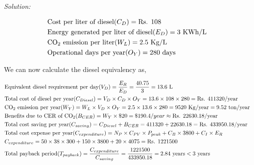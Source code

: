\documentclass{home_assignment}
\begin{document}
\pagebreak
\textit{Solution:}
\begin{fleqn}[\parindent]
    \begin{equation*}
       \begin{split}
        &\text{Cost per liter of diesel} (C_{D})= \text{Rs. } 108\\
        &\text{Energy generated per liter of diesel} (E_{D})=3 \text{ KWh/L}\\
        &\text{CO\textsubscript{2} emission per liter} (W_L)=2.5 \text{ Kg/L}\\
        &\text{Operational days per year} (O_Y)=280 \text{ days}       \end{split}
       \end{equation*}
\end{fleqn}
We can now calculate the diesel equivalency as,
\begin{fleqn}[\parindent]
    \begin{equation*}
       \begin{split}
        &\text{Equivalent diesel requirement per day} (V_{D})=\frac{E_R}{E_{D}} = \frac{40.75}{3}=13.6 \text{ L} \\
        &\text{Total cost of diesel per year} (C_{Diesel})= V_{D}\times C_{D}\times O_Y=13.6\times108\times280=\text{Rs. }411320\text{/year}\\
        &\text{CO\textsubscript{2} emission per year}(W_Y)=W_L\times V_{D}\times O_Y=2.5\times 13.6 \times 280=9520 \text{ Kg/year}=9.52 \text{ ton/year}\\
        &\text{Benefits due to CER of CO\textsubscript{2}} (B_{CER})=W_Y\times \$ 20=\$190.4/year\approx \text{Rs. }22630.18\text{/year}\\
        &\text{Total cost saving per year} (C_{saving})=C_{Diesel}+B_{CER}=411320+22630.18=\text{Rs. }433950.18\text{/year}\\
        &\text{Total cost expense per year} (C_{expenditure})=N_P\times C_{PV}\times P_{peak}+C_{B}\times3800+C_I\times E_R\\
        &C_{expenditure}=50\times38\times300+150\times3800+20\times4075=\text{Rs. }1221500\\
        &\text{Total payback period} (T_{payback})=\frac{C_{expenditure}}{C_{saving}}=\frac{1221500}{433950.18}=2.84\text{ years}<3 \text{ years}
         \end{split}
       \end{equation*}
\end{fleqn}
\end{document}
